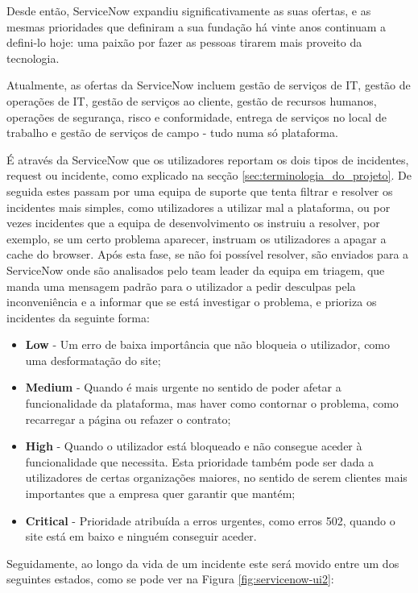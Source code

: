         Desde então, ServiceNow expandiu significativamente as suas ofertas, e as mesmas prioridades que definiram a sua fundação há vinte anos continuam a defini-lo hoje: uma paixão por fazer as pessoas tirarem mais proveito da tecnologia. 
        
        Atualmente, as ofertas da ServiceNow incluem gestão de serviços de IT, gestão de operações de IT, gestão de serviços ao cliente, gestão de recursos humanos, operações de segurança, risco e conformidade, entrega de serviços no local de trabalho e gestão de serviços de campo - tudo numa só plataforma.

        É através da ServiceNow que os utilizadores reportam os dois tipos de incidentes, request ou incidente, como explicado na secção \ref{sec:terminologia_do_projeto}. De seguida estes passam por uma equipa de suporte que tenta filtrar e resolver os incidentes mais simples, como utilizadores a utilizar mal a plataforma, ou por vezes incidentes que a equipa de desenvolvimento os instruiu a resolver, por exemplo, se um certo problema aparecer, instruam os utilizadores a apagar a cache do browser. Após esta fase, se não foi possível resolver, são enviados para a ServiceNow onde são analisados pelo team leader da equipa em triagem, que manda uma mensagem padrão para o utilizador a pedir desculpas pela inconveniência e a informar que se está investigar o problema, e prioriza os incidentes da seguinte forma:
        \begin{itemize}
            \item \textbf{Low} - Um erro de baixa importância que não bloqueia o utilizador, como uma desformatação do site;
            \item \textbf{Medium} - Quando é mais urgente no sentido de poder afetar a funcionalidade da plataforma, mas haver como contornar o problema, como recarregar a página ou refazer o contrato;
            \item \textbf{High} - Quando o utilizador está bloqueado e não consegue aceder à funcionalidade que necessita. Esta prioridade também pode ser dada a utilizadores de certas organizações maiores, no sentido de serem clientes mais importantes que a empresa quer garantir que mantém;
            \item \textbf{Critical} - Prioridade atribuída a erros urgentes, como erros 502, quando o site está em baixo e ninguém conseguir aceder.
        \end{itemize}
        Seguidamente, ao longo da vida de um incidente este será movido entre um dos seguintes estados, como se pode ver na Figura \ref{fig:servicenow-ui2}:
